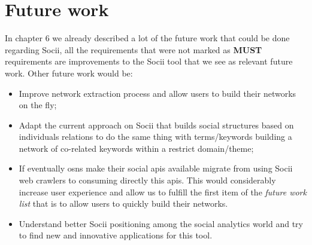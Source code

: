 \section{Future work}
In chapter 6 we already described a lot of the future work that could be done regarding Socii, all the requirements that were not marked as \textbf{MUST} requirements
are improvements to the Socii tool that we see as relevant future work. Other future work would be:

\begin{itemize}
    \item Improve network extraction process and allow users to build their networks on the fly;
    \item Adapt the current approach on Socii that builds social structures based on individuals relations to do the same thing with terms/keywords
    building a network of co-related keywords within a restrict domain/theme;
    \item If eventually \glspl{osn} make their social \glspl{api} available migrate from using Socii web crawlers to consuming directly this \glspl{api}. This would
    considerably increase user experience and allow us to fulfill the first item of the \textit{future work list} that is to allow users to quickly build their networks.
    \item Understand better Socii positioning among the social analytics world and try to find new and innovative applications for this tool.
\end{itemize}

